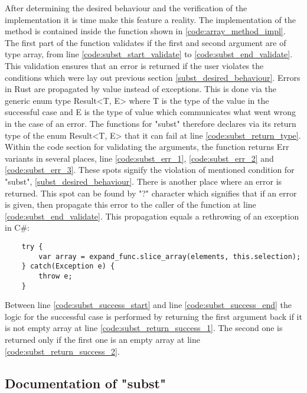 After determining the desired behaviour and the verification of the implementation
it is time make this feature a reality.
The implementation of the method is contained inside the function shown in \ref{code:array_method_impl}.
The first part of the function validates if the first and second argument are of type array,
from line \ref{code:subst_start_validate} to \ref{code:subst_end_validate}.
This validation ensures that an error is returned
if the user violates the conditions which were lay out previous section \ref{subst_desired_behaviour}.
Errors in Rust are propagated by value instead of exceptions.
This is done via the generic enum type Result<T, E> where T is the type of the value in the successful case
and E is the type of value which communicates what went wrong in the case of an error.
The functions for "subst" therefore declares via its return type of the enum Result<T, E> that it can fail at line \ref{code:subst_return_type}.
Within the code section for validating the arguments, the function returns Err variants in several places, line \ref{code:subst_err_1}, \ref{code:subst_err_2} and \ref{code:subst_err_3}.
These spots signify the violation of mentioned condition for "subst", \ref{subst_desired_behaviour}.
There is another place where an error is returned. This spot can be found by "?" character which signifies that if an error is given,
then propagate this error to the caller of the function at line \ref{code:subst_end_validate}.
This propagation equals a rethrowing of an exception in C\#:

\begin{verbatim}
	try {
		var array = expand_func.slice_array(elements, this.selection);
	} catch(Exception e) {
		throw e;
	}
\end{verbatim}

Between line \ref{code:subst_success_start} and line \ref{code:subst_success_end}
the logic for the successful case is performed
by returning the first argument back if it is not empty array at line \ref{code:subst_return_success_1}.
The second one is returned only if the first one is an empty array at line \ref{code:subst_return_success_2}.


\subsection{Documentation of "subst"}

